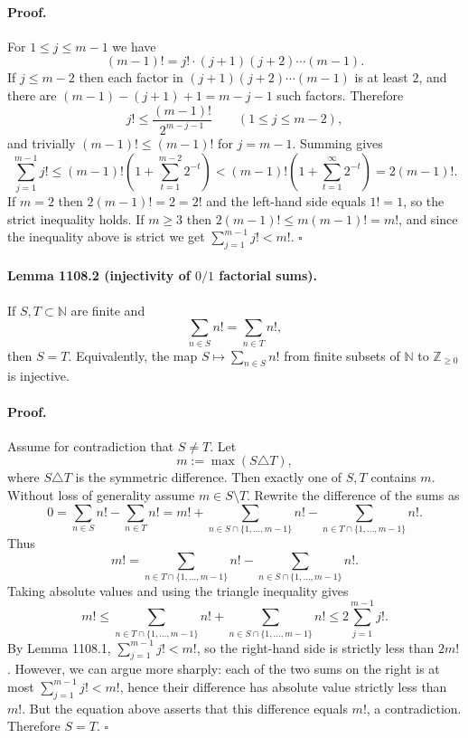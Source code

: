 \paragraph{Proof.}
For $1\le j\le m-1$ we have
\[(m-1)! = j!\cdot (j+1)(j+2)\cdots(m-1).\]
If $j\le m-2$ then each factor in $(j+1)(j+2)\cdots(m-1)$ is at least $2$, and there are $(m-1)-(j+1)+1 = m-j-1$ such factors. Therefore
\[j!\le \frac{(m-1)!}{2^{m-j-1}}\qquad (1\le j\le m-2),\]
and trivially $(m-1)!\le (m-1)!$ for $j=m-1$.
Summing gives
\[\sum_{j=1}^{m-1} j! \le (m-1)!\left(1+\sum_{t=1}^{m-2} 2^{-t}\right) < (m-1)!\left(1+\sum_{t=1}^{\infty} 2^{-t}\right) = 2(m-1)!.\]
If $m=2$ then $2(m-1)!=2=2!$ and the left-hand side equals $1! =1$, so the strict inequality holds.
If $m\ge 3$ then $2(m-1)!\le m(m-1)! = m!$, and since the inequality above is strict we get $\sum_{j=1}^{m-1} j! < m!$.
\hfill $\square$

\paragraph{Lemma 1108.2 (injectivity of $0/1$ factorial sums).}
If $S,T\subset\mathbb{N}$ are finite and
\[\sum_{n\in S} n! = \sum_{n\in T} n!,\]
then $S=T$. Equivalently, the map $S\mapsto \sum_{n\in S} n!$ from finite subsets of $\mathbb{N}$ to $\mathbb{Z}_{\ge 0}$ is injective.

\paragraph{Proof.}
Assume for contradiction that $S\ne T$. Let
\[m:=\max(S\triangle T),\]
where $S\triangle T$ is the symmetric difference.
Then exactly one of $S,T$ contains $m$. Without loss of generality assume $m\in S\setminus T$.
Rewrite the difference of the sums as
\[0=\sum_{n\in S} n! - \sum_{n\in T} n! = m! + \sum_{n\in S\cap\{1,\dots,m-1\}} n! - \sum_{n\in T\cap\{1,\dots,m-1\}} n!.\]
Thus
\[m! = \sum_{n\in T\cap\{1,\dots,m-1\}} n! - \sum_{n\in S\cap\{1,\dots,m-1\}} n!.
\]
Taking absolute values and using the triangle inequality gives
\[m! \le \sum_{n\in T\cap\{1,\dots,m-1\}} n! + \sum_{n\in S\cap\{1,\dots,m-1\}} n! \le 2\sum_{j=1}^{m-1} j!.
\]
By Lemma 1108.1, $\sum_{j=1}^{m-1} j! < m!$, so the right-hand side is strictly less than $2m!$.
However, we can argue more sharply: each of the two sums on the right is at most $\sum_{j=1}^{m-1} j! < m!$, hence their difference has absolute value strictly less than $m!$.
But the equation above asserts that this difference equals $m!$, a contradiction.
Therefore $S=T$. \hfill $\square$


